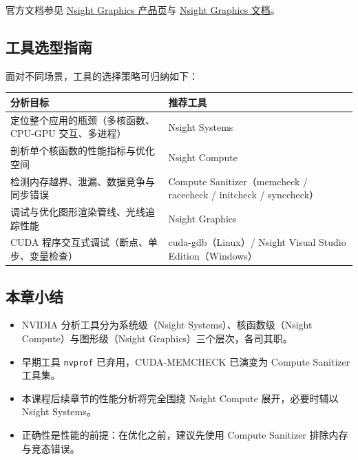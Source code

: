 官方文档参见 \href{https://developer.nvidia.com/nsight-graphics}{Nsight Graphics 产品页}与 \href{https://docs.nvidia.com/nsight-graphics/}{Nsight Graphics 文档}。

\subsection{工具选型指南}

面对不同场景，工具的选择策略可归纳如下：

\begin{center}
\begin{tabular}{|p{4.2cm}|p{8.2cm}|}
\hline
\textbf{分析目标} & \textbf{推荐工具} \\
\hline
定位整个应用的瓶颈（多核函数、CPU-GPU 交互、多进程） & Nsight Systems \\
\hline
剖析单个核函数的性能指标与优化空间 & Nsight Compute \\
\hline
检测内存越界、泄漏、数据竞争与同步错误 & Compute Sanitizer（memcheck / racecheck / initcheck / synccheck） \\
\hline
调试与优化图形渲染管线、光线追踪性能 & Nsight Graphics \\
\hline
CUDA 程序交互式调试（断点、单步、变量检查） & cuda-gdb（Linux）/ Nsight Visual Studio Edition（Windows） \\
\hline
\end{tabular}
\end{center}

\subsection{本章小结}

\begin{itemize}
    \item NVIDIA 分析工具分为系统级（Nsight Systems）、核函数级（Nsight Compute）与图形级（Nsight Graphics）三个层次，各司其职。
    \item 早期工具 \texttt{nvprof} 已弃用，CUDA-MEMCHECK 已演变为 Compute Sanitizer 工具集。
    \item 本课程后续章节的性能分析将完全围绕 Nsight Compute 展开，必要时辅以 Nsight Systems。
    \item 正确性是性能的前提：在优化之前，建议先使用 Compute Sanitizer 排除内存与竞态错误。
\end{itemize}
